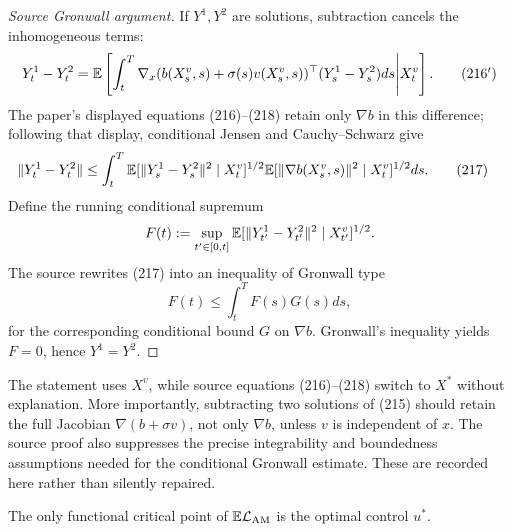 \begin{proof}[Source Gronwall argument]
If $Y^1,Y^2$ are solutions, subtraction cancels the inhomogeneous terms:
\begin{equation*}
 Y_t^1-Y_t^2
 =\mathbb{E}\left[
 \int_t^T
 \nabla_x(b(X_s^v,s)+\sigma(s)v(X_s^v,s))^\top
 (Y_s^1-Y_s^2)ds
 \middle|X_t^v
 \right].
 \tag{216$'$}
\end{equation*}
The paper's displayed equations (216)--(218) retain only $\nabla b$ in this difference; following that display, conditional Jensen and Cauchy--Schwarz give
\begin{align*}
 \|Y_t^1-Y_t^2\|
 &\le\int_t^T
 \mathbb{E}[\|Y_s^1-Y_s^2\|^2\mid X_t^v]^{1/2}
 \mathbb{E}[\|\nabla b(X_s^v,s)\|^2\mid X_t^v]^{1/2}ds.
 \tag{217}
\end{align*}
Define the running conditional supremum
\[
 F(t):=\sup_{t'\in[0,t]}
 \mathbb{E}[\|Y_{t'}^1-Y_{t'}^2\|^2\mid X_{t'}^v]^{1/2}.
\]
The source rewrites (217) into an inequality of Gronwall type
\begin{equation*}
 F(t)\le\int_t^T F(s)G(s)ds,
 \tag{218}
\end{equation*}
for the corresponding conditional bound $G$ on $\nabla b$.  Gronwall's inequality yields $F=0$, hence $Y^1=Y^2$.
\end{proof}

\begin{remark}
The statement uses $X^v$, while source equations (216)--(218) switch to $X^*$ without explanation.  More importantly, subtracting two solutions of (215) should retain the full Jacobian $\nabla(b+\sigma v)$, not only $\nabla b$, unless $v$ is independent of $x$.  The source proof also suppresses the precise integrability and boundedness assumptions needed for the conditional Gronwall estimate.  These are recorded here rather than silently repaired.
\end{remark}

\begin{proposition}
The only functional critical point of $\mathbb{E}\mathcal L_{\mathrm{AM}}$ is the optimal control $u^*$.
\end{proposition}

